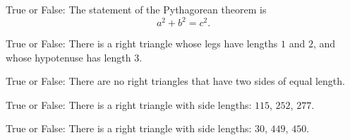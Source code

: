 \documentclass[nooutcomes,noauthor]{ximera}
\author{Bart Snapp}
\begin{document}
\maketitle





\begin{exercise}  
  True or False:
  The statement of the Pythagorean theorem is
  \[
  a^2 + b^2 = c^2.
  \]
\end{exercise}

\begin{exercise}True or False:
 There is a right triangle whose legs have lengths $1$ and $2$, and whose hypotenuse has length $3$.
\end{exercise}





\begin{exercise}
  True or False:
  There are no right triangles that have two sides of equal length.
\end{exercise}

\begin{exercise}
  True or False:
  There is a right triangle with side lengths: $115$, $252$, $277$.
\end{exercise}



\begin{exercise}
  True or False:
  There is a right triangle with side lengths: $30$, $449$, $450$.
\end{exercise}




\end{document}

